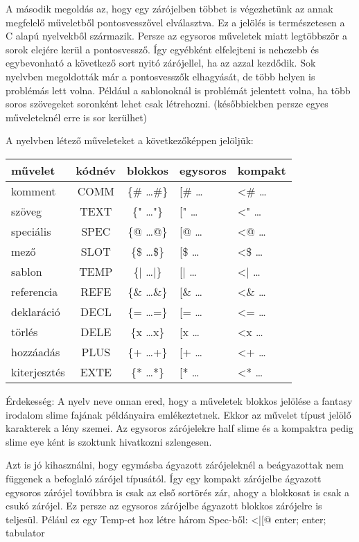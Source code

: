 A második megoldás az, hogy egy zárójelben többet is végezhetünk az annak megfelelő műveletből pontosvesszővel elválasztva. 
Ez a jelölés is természetesen a C alapú nyelvekből származik. 
Persze az egysoros műveletek miatt legtöbbször a sorok elejére kerül a pontosvessző. 
Így egyébként elfelejteni is nehezebb és egybevonható a következő sort nyitó zárójellel, ha az azzal kezdődik. 
Sok nyelvben megoldották már a pontosvesszők elhagyását, de több helyen is problémás lett volna.
Például a sablonoknál is problémát jelentett volna, ha több soros szövegeket soronként lehet csak létrehozni. 
(későbbiekben persze egyes műveleteknél erre is sor kerülhet)

A nyelvben létező műveleteket a következőképpen jelöljük:

\begin{center}
  \begin{tabular}{ | l | c | c | l | l | }
    \hline
    művelet		& kódnév 	& blokkos 		& egysoros 	& kompakt	\\ \hline
    komment		& COMM 		& \{\# …\#\} 	& [\# … 	& <\# … 	\\ \hline
    szöveg 		& TEXT 		& \{" …"\} 		& [" … 		& <" … 		\\ \hline
    speciális	& SPEC 		& \{@ …@\} 		& [@ … 		& <@ … 		\\ \hline
    mező 		& SLOT 		& \{\$ …\$\} 	& [\$ … 	& <\$ … 	\\ \hline
    sablon 		& TEMP 		& \{| …|\} 		& [| … 		& <| … 		\\ \hline
    referencia	& REFE 		& \{\& …\&\} 	& [\& … 	& <\& … 	\\ \hline 
    deklaráció 	& DECL 		& \{= …=\} 		& [= … 		& <= … 		\\ \hline
    törlés 		& DELE 		& \{x …x\} 		& [x … 		& <x … 		\\ \hline
    hozzáadás	& PLUS 		& \{+ …+\} 		& [+ … 		& <+ … 		\\ \hline
    kiterjesztés& EXTE 		& \{* …*\} 		& [* … 		& <* … 		\\
    \hline
  \end{tabular}
\end{center}
	 	 	
Érdekesség:
A nyelv neve onnan ered, hogy a műveletek blokkos jelölése a fantasy irodalom slime fajának példányaira emlékeztetnek.
Ekkor az művelet típust jelölő karakterek a lény szemei. 
Az egysoros zárójelekre half slime és a kompaktra pedig slime eye ként is szoktunk hivatkozni szlengesen.

Azt is jó kihasználni, hogy egymásba ágyazott zárójeleknél a beágyazottak nem függenek a befoglaló zárójel típusától. 
Így egy kompakt zárójelbe ágyazott egysoros zárójel továbbra is csak az első sortörés zár, ahogy a blokkosat is csak a csukó zárójel. 
Ez persze az egysoros zárójelbe ágyazott blokkos zárójelre is teljesül. 
Pélául ez egy Temp-et hoz létre három Spec-ből: <|[@ enter; enter; tabulator

